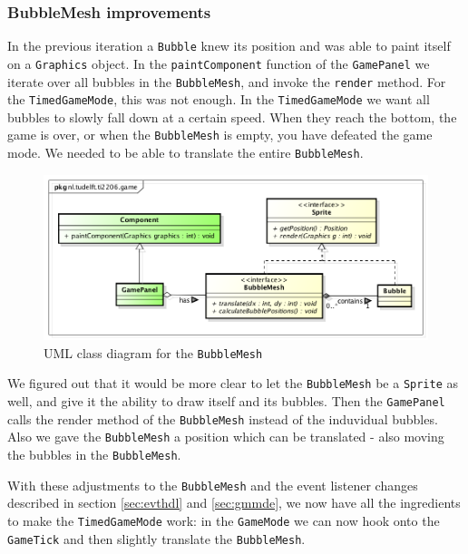 \documentclass[a4paper]{article}
\begin{document}
\subsubsection{BubbleMesh improvements}
In the previous iteration a \texttt{Bubble} knew its position and was able to paint itself on a \texttt{Graphics} object. In the \texttt{paintComponent} function of the \texttt{GamePanel} we iterate over all bubbles in the \texttt{BubbleMesh}, and invoke the \texttt{render} method.
For the \texttt{TimedGameMode}, this was not enough. In the \texttt{TimedGameMode} we want all bubbles to slowly fall down at a certain speed. When they reach the bottom, the game is over, or when the \texttt{BubbleMesh} is empty, you have defeated the game mode. We needed to be able to translate the entire \texttt{BubbleMesh}.

\begin{figure}[H]
	\centering
	\includegraphics[scale=0.5]{BubbleMeshSprite.png}
    \caption{UML class diagram for the \texttt{BubbleMesh} }
    \label{fig:bmeshsprite}
\end{figure}

We figured out that it would be more clear to let the \texttt{BubbleMesh} be a \texttt{Sprite} as well, and give it the ability to draw itself and its bubbles. Then the \texttt{GamePanel} calls the render method of the \texttt{BubbleMesh} instead of the induvidual bubbles. Also we gave the \texttt{BubbleMesh} a position which can be translated - also moving the bubbles in the \texttt{BubbleMesh}.

\par{} With these adjustments to the \texttt{BubbleMesh} and the event listener changes described in section \ref{sec:evthdl} and \ref{sec:gmmde}, we now have all the ingredients to make the \texttt{TimedGameMode} work: in the \texttt{GameMode} we can now hook onto the \texttt{GameTick} and then slightly translate the \texttt{BubbleMesh}.
\end{document}
